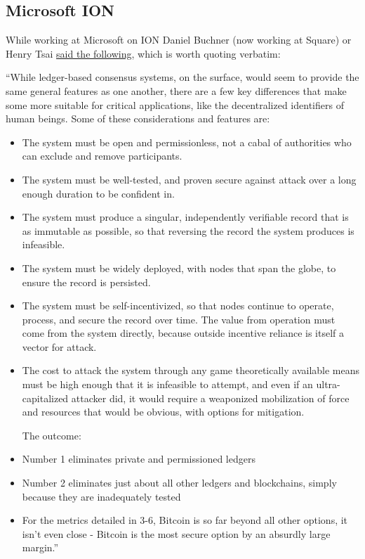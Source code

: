 \subsection{Microsoft ION}
While working at Microsoft on ION Daniel Buchner (now working at Square) or Henry Tsai \href{https://github.com/decentralized-identity/ion/blob/master/docs/Q-and-A.md}{said the following}, which is worth quoting verbatim:\par
``While ledger-based consensus systems, on the surface, would seem to provide the same general features as one another, there are a few key differences that make some more suitable for critical applications, like the decentralized identifiers of human beings. Some of these considerations and features are:
\begin{itemize}
\item The system must be open and permissionless, not a cabal of authorities who can exclude and remove participants.
\item The system must be well-tested, and proven secure against attack over a long enough duration to be confident in.
\item The system must produce a singular, independently verifiable record that is as immutable as possible, so that reversing the record the system produces is infeasible.
\item The system must be widely deployed, with nodes that span the globe, to ensure the record is persisted.
\item The system must be self-incentivized, so that nodes continue to operate, process, and secure the record over time. The value from operation must come from the system directly, because outside incentive reliance is itself a vector for attack.
\item The cost to attack the system through any game theoretically available means must be high enough that it is infeasible to attempt, and even if an ultra-capitalized attacker did, it would require a weaponized mobilization of force and resources that would be obvious, with options for mitigation.\par

The outcome:

\item Number 1 eliminates private and permissioned ledgers
\item Number 2 eliminates just about all other ledgers and blockchains, simply because they are inadequately tested
\item For the metrics detailed in 3-6, Bitcoin is so far beyond all other options, it isn't even close - Bitcoin is the most secure option by an absurdly large margin.''
\end{itemize}

